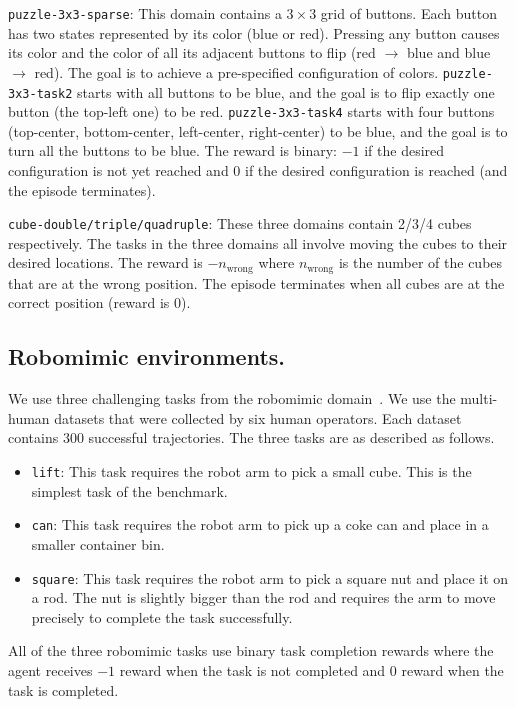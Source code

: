 \texttt{puzzle-3x3-sparse}: This domain contains a $3\times3$ grid of buttons. Each button has two states represented by its color (blue or red). Pressing any button causes its color and the color of all its adjacent buttons to flip (red $\rightarrow$ blue and blue $\rightarrow$ red). The goal is to achieve a pre-specified configuration of colors. \texttt{puzzle-3x3-task2} starts with all buttons to be blue, and the goal is to flip exactly one button (the top-left one) to be red. \texttt{puzzle-3x3-task4} starts with four buttons (top-center, bottom-center, left-center, right-center) to be blue, and the goal is to turn all the buttons to be blue. The reward is binary: $-1$ if the desired configuration is not yet reached and $0$ if the desired configuration is reached (and the episode terminates).


\texttt{cube-double/triple/quadruple}: These three domains contain 2/3/4 cubes respectively. The tasks in the three domains all involve moving the cubes to their desired locations.
The reward is $-n_{\mathrm{wrong}}$ where $n_{\mathrm{wrong}}$ is the number of the cubes that are at the wrong position. The episode terminates when all cubes are at the correct position (reward is 0).

\subsection{Robomimic environments.} We use three challenging tasks from the robomimic domain~\citep{robomimic2021}.
We use the multi-human datasets that were collected by six human operators. Each dataset contains 300 successful trajectories. The three tasks are as described as follows.
\begin{itemize}
    \item \texttt{lift}: This task requires the robot arm to pick a small cube. This is the simplest task of the benchmark.
    \item \texttt{can}: This task requires the robot arm to pick up a coke can and place in a smaller container bin.
    \item \texttt{square}: This task requires the robot arm to pick a square nut and place it on a rod. The nut is slightly bigger than the rod and requires the arm to move precisely to complete the task successfully.
\end{itemize}

All of the three robomimic tasks use binary task completion rewards where the agent receives $-1$ reward when the task is not completed and $0$ reward when the task is completed.

